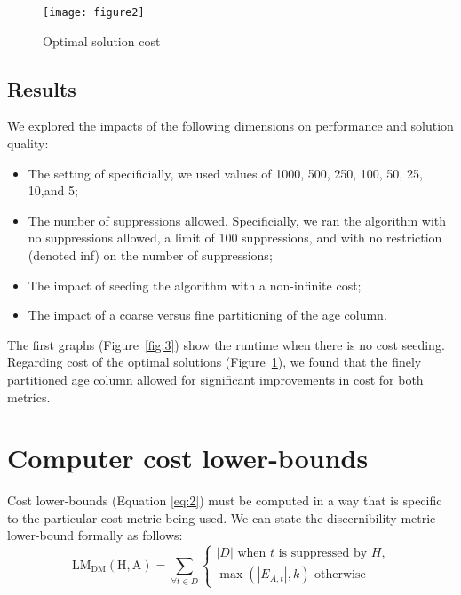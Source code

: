 \documentclass[]{seismica}
\begin{document}
   \begin{figure}[ht!]
       \texttt{[image: figure2]}
       \caption{Optimal solution cost}
       \label{fig:4}
   \end{figure}

	\subsection{Results}
	We explored the impacts of the following dimensions on performance and solution quality:

    \begin{itemize}
        \item The setting of specificially, we used values of 1000, 500, 250, 100, 50, 25, 10,and 5;
        \item The number of suppressions allowed. Specificially, we ran the algorithm with no suppressions allowed, a limit of 100 suppressions, and with no restriction (denoted inf) on the number of suppressions;
        \item The impact of seeding the algorithm with a non-infinite cost;
        \item The impact of a coarse versus fine partitioning of the age column.
    \end{itemize}

    The first graphs (Figure~\ref{fig:3}) show the runtime when there is no cost seeding. Regarding cost of the optimal solutions (Figure~\ref{fig:4}), we found that the finely partitioned age column allowed for significant improvements in cost for both metrics.

\section{Computer cost lower-bounds}
    
    Cost lower-bounds (Equation \ref{eq:2}) must be computed in a way that is specific to the particular cost metric being used. We can state the discernibility metric lower-bound formally as follows:
    \begin{equation} \label{eq:2}
    \mathrm{LM_{DM}(H,A)} = \sum_{\forall t \in D}
    \begin{cases}
        \left | D \right | \text{ when $t$ is suppressed by $H$,}\\
        \max(\left | E_{A,t} \right |, k) \text{ otherwise}
    \end{cases}
    \end{equation}
\end{document}
